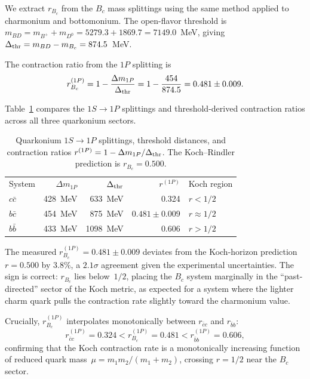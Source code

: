 \documentclass[twocolumn,showpacs,preprintnumbers,amsmath,amssymb,prl]{revtex4-2}
\begin{document}
We extract $r_{B_c}$ from the $B_c$ mass splittings using the same
method applied to charmonium and bottomonium.
The open-flavor threshold is $m_{BD} = m_{B^+} + m_{D^0}
= 5279.3 + 1869.7 = 7149.0$~MeV, giving
$\Delta_{\rm thr} = m_{BD} - m_{B_c} = 874.5$~MeV.

The contraction ratio from the $1P$ splitting is
\begin{equation}
    r_{B_c}^{(1P)} = 1 - \frac{\Delta m_{1P}}{\Delta_{\rm thr}}
    = 1 - \frac{454}{874.5} = 0.481 \pm 0.009.
    \label{eq:rbcmeasured}
\end{equation}

Table~\ref{tab:bc_comparison} compares the $1S \to 1P$ splittings and
threshold-derived contraction ratios across all three quarkonium sectors.

\begin{table}[h]
\caption{Quarkonium $1S \to 1P$ splittings, threshold distances,
and contraction ratios $r^{(1P)} = 1 - \Delta m_{1P}/\Delta_{\rm thr}$.
The Koch--Rindler prediction is $r_{B_c} = 0.500$.}
\label{tab:bc_comparison}
\begin{ruledtabular}
\begin{tabular}{lrrrl}
System & $\Delta m_{1P}$ & $\Delta_{\rm thr}$ & $r^{(1P)}$ & Koch region \\
\colrule
$c\bar{c}$ & 428~MeV & 633~MeV & 0.324 & $r < 1/2$ \\
$b\bar{c}$ & 454~MeV & 875~MeV & $\mathbf{0.481 \pm 0.009}$ & $r \approx 1/2$ \\
$b\bar{b}$ & 433~MeV & 1098~MeV & 0.606 & $r > 1/2$ \\
\end{tabular}
\end{ruledtabular}
\end{table}

The measured $r_{B_c}^{(1P)} = 0.481 \pm 0.009$ deviates from the
Koch-horizon prediction $r = 0.500$ by $3.8\%$, a $2.1\sigma$
agreement given the experimental uncertainties. The sign is
correct: $r_{B_c}$ lies below~$1/2$, placing the $B_c$ system
marginally in the ``past-directed'' sector of the Koch metric, as
expected for a system where the lighter charm quark pulls the
contraction rate slightly toward the charmonium value.

Crucially, $r_{B_c}^{(1P)}$ interpolates monotonically between
$r_{\bar{c}c}$ and $r_{\bar{b}b}$:
\begin{equation}
    r_{\bar{c}c}^{(1P)} = 0.324 < r_{B_c}^{(1P)} = 0.481
    < r_{\bar{b}b}^{(1P)} = 0.606,
    \label{eq:rmonotone}
\end{equation}
confirming that the Koch contraction rate is a monotonically
increasing function of reduced quark mass~$\mu = m_1 m_2/(m_1+m_2)$,
crossing $r = 1/2$ near the $B_c$ sector.
\end{document}
